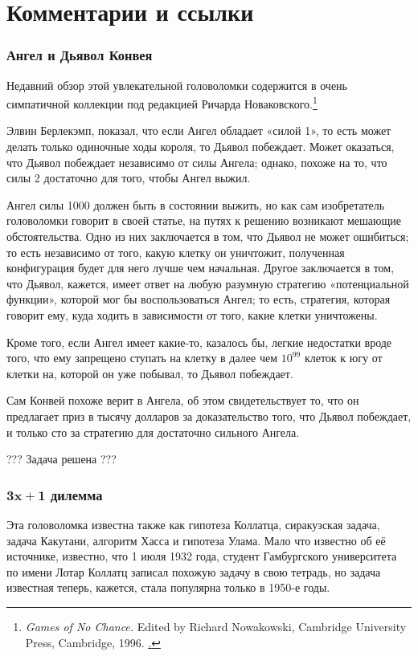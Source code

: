 \section*{Комментарии и ссылки}

\subsubsection*{Ангел и Дьявол Конвея}

Недавний обзор этой увлекательной головоломки содержится в очень симпатичной коллекции под редакцией Ричарда Новаковского.\footnote{\emph{Games of No Chance.} Edited by Richard Nowakowski, Cambridge University Press, Cambridge, 1996. \href{http://library.msri.org/books/Book29/}.} 

Элвин Берлекэмп,  показал, что если Ангел обладает «силой 1», то есть может делать только одиночные ходы короля, то Дьявол побеждает.
Может оказаться, что Дьявол побеждает независимо от силы Ангела; 
однако, похоже на то, что силы 2 достаточно для того, чтобы Ангел выжил.

Ангел силы 1000 должен быть в состоянии выжить, но как сам изобретатель головоломки говорит в своей статье, на путях к решению возникают мешающие обстоятельства.
Одно из них заключается в том, что Дьявол не может ошибиться;
то есть независимо от того, какую клетку он уничтожит, полученная конфигурация будет для него лучше чем начальная.
Другое заключается в том, что Дьявол, кажется, имеет ответ на любую разумную стратегию «потенциальной функции», которой мог бы воспользоваться Ангел;
то есть, стратегия, которая говорит ему, куда ходить в зависимости от того, какие клетки уничтожены. %

Кроме того, если Ангел имеет какие-то, казалось бы, легкие недостатки вроде того, что ему запрещено ступать на клетку в далее чем $10^{99}$ клеток к югу от клетки на, которой он уже побывал, то Дьявол побеждает.

Сам Конвей похоже верит в Ангела, об этом свидетельствует то, что он предлагает приз в тысячу долларов за доказательство того, что Дьявол побеждает, и только сто за стратегию для достаточно сильного Ангела.

??? Задача решена ???

\subsubsection*{$\bm{3x+1}$ дилемма}

Эта головоломка известна также как гипотеза Коллатца, сиракузская задача, задача Какутани, алгоритм Хасса и гипотеза Улама.
Мало что известно об её источнике, известно, что 1 июля 1932 года, студент Гамбургского университета по имени Лотар Коллатц записал похожую задачу в свою тетрадь, но задача известная теперь, кажется, стала популярна только в 1950-е годы.

